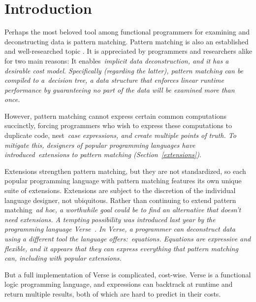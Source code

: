 \documentclass[article,screen,12pt, nonacm]{acmart}
\begin{document}
\maketitle

\section{Introduction}

Perhaps the most beloved tool among functional programmers for examining and
deconstructing data is pattern matching. 
Pattern matching is also an established and well-researched topic
\citep{wadler1987views, macqueen1985tree, burton1993pattern, palao1996new,
maranget, bpc}. It is appreciated by programmers and researchers alike for two
main reasons: It enables~\it{implicit} data deconstruction, and it has a
desirable cost model. Specifically (regarding the latter), pattern matching can
be compiled to a~\it{decision tree}, a data structure that enforces linear
runtime performance by guaranteeing no part of the data will be examined more
than once.~\citep{maranget}

However, pattern matching cannot express certain common computations succinctly,
forcing programmers who wish to express these computations to duplicate code,
nest~\it{case} expressions, and create multiple points of truth. To mitigate
this, designers of popular programming languages have introduced~\it{extensions}
to pattern matching (Section~\ref{extensions}). 

Extensions strengthen pattern matching, but they are not standardized, so each
popular programming language with pattern matching features its own unique suite
of extensions. Extensions are subject to the discretion of the individual
language designer, not ubiquitous. Rather than continuing to extend pattern
matching~\it{ad hoc}, a worthwhile goal could be to find an alternative that
doesn't need extensions. A tempting possibility was introduced last year by the
programming language Verse~\citep{verse}. In Verse, a programmer can deconstruct
data using a different tool the language offers:~\it{equations}. Equations are
expressive and flexible, and it appears that they can express everything that
pattern matching can, including with popular extensions. 

But a full implementation of Verse is complicated, cost-wise. Verse is a
functional logic programming language, and expressions can backtrack at runtime
and return multiple results, both of which are hard to predict in their costs. 
\end{document}
